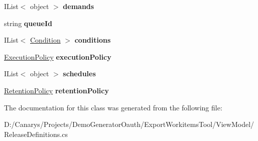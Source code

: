 \begin{DoxyCompactItemize}
\item 
\mbox{\label{class_templates_generator_tool_1_1_view_model_1_1_release_definitions_1_1_environment_ac4e9c033dc8bbc12ea44d8bb9af6e05a}} 
I\+List$<$ object $>$ {\bfseries demands}
\item 
\mbox{\label{class_templates_generator_tool_1_1_view_model_1_1_release_definitions_1_1_environment_a0e11e32a6ba3b578d1c570e40d664ec8}} 
string {\bfseries queue\+Id}
\item 
\mbox{\label{class_templates_generator_tool_1_1_view_model_1_1_release_definitions_1_1_environment_ad3895cea689f8b1d28c61f1d381c7042}} 
I\+List$<$ \mbox{\hyperlink{class_templates_generator_tool_1_1_view_model_1_1_release_definitions_1_1_condition}{Condition}} $>$ {\bfseries conditions}
\item 
\mbox{\label{class_templates_generator_tool_1_1_view_model_1_1_release_definitions_1_1_environment_adb5c3c7d66ed80bc207351b819e18dcb}} 
\mbox{\hyperlink{class_templates_generator_tool_1_1_view_model_1_1_release_definitions_1_1_execution_policy}{Execution\+Policy}} {\bfseries execution\+Policy}
\item 
\mbox{\label{class_templates_generator_tool_1_1_view_model_1_1_release_definitions_1_1_environment_aca8a80fc29b644900a504c2217ad462a}} 
I\+List$<$ object $>$ {\bfseries schedules}
\item 
\mbox{\label{class_templates_generator_tool_1_1_view_model_1_1_release_definitions_1_1_environment_a0f759cbef2398004bed38aa3d895a54d}} 
\mbox{\hyperlink{class_templates_generator_tool_1_1_view_model_1_1_release_definitions_1_1_retention_policy}{Retention\+Policy}} {\bfseries retention\+Policy}
\end{DoxyCompactItemize}


The documentation for this class was generated from the following file\+:\begin{DoxyCompactItemize}
\item 
D\+:/\+Canarys/\+Projects/\+Demo\+Generator\+Oauth/\+Export\+Workitems\+Tool/\+View\+Model/Release\+Definitions.\+cs\end{DoxyCompactItemize}
